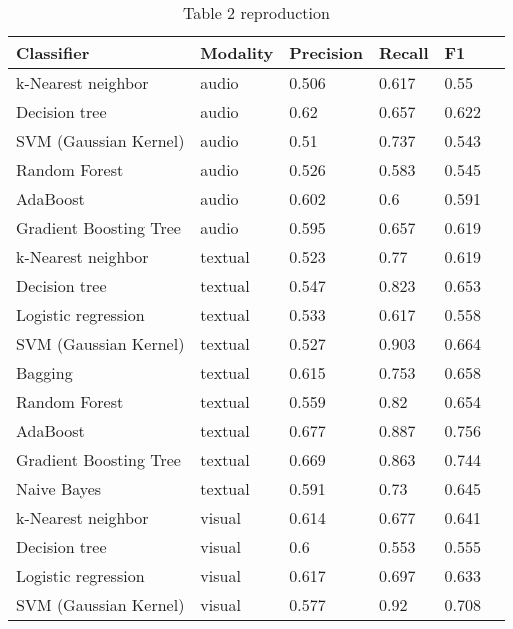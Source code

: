 \documentclass[sigconf]{acmart}
\begin{document}
\begin{table}[hbt!]
  \caption*{Table 2 reproduction}
  \begin{tabular}{llllll}
    \hline
    Classifier             & Modality & Precision & Recall & F1    \\ \hline %
    k-Nearest neighbor     & audio    & 0.506     & 0.617  & 0.55  \\ %
    Decision tree          & audio    & 0.62      & 0.657  & 0.622 \\ %
    SVM (Gaussian Kernel)  & audio    & 0.51      & 0.737  & 0.543 \\ %
    Random Forest          & audio    & 0.526     & 0.583  & 0.545 \\ %
    AdaBoost               & audio    & 0.602     & 0.6    & 0.591 \\ %
    Gradient Boosting Tree & audio    & 0.595     & 0.657  & 0.619 \\ %
    k-Nearest neighbor     & textual  & 0.523     & 0.77   & 0.619 \\ %
    Decision tree          & textual  & 0.547     & 0.823  & 0.653 \\ %
    Logistic regression    & textual  & 0.533     & 0.617  & 0.558 \\ %
    SVM (Gaussian Kernel)  & textual  & 0.527     & 0.903  & 0.664 \\ %
    Bagging                & textual  & 0.615     & 0.753  & 0.658 \\ %
    Random Forest          & textual  & 0.559     & 0.82   & 0.654 \\ %
    AdaBoost               & textual  & 0.677     & 0.887  & 0.756 \\ %
    Gradient Boosting Tree & textual  & 0.669     & 0.863  & 0.744 \\ %
    Naive Bayes            & textual  & 0.591     & 0.73   & 0.645 \\ %
    k-Nearest neighbor     & visual   & 0.614     & 0.677  & 0.641 \\ %
    Decision tree          & visual   & 0.6       & 0.553  & 0.555 \\ %
    Logistic regression    & visual   & 0.617     & 0.697  & 0.633 \\ %
    SVM (Gaussian Kernel)  & visual   & 0.577     & 0.92   & 0.708 \\ %

\end{tabular}
\end{table}
\end{document}
